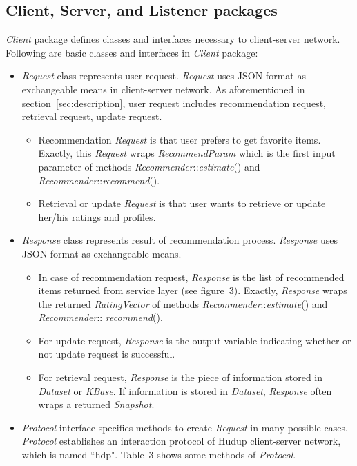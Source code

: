 \documentclass[a4paper]{llncs}
\begin{document}
\subsection{Client, Server, and Listener packages}
\label{subsec:client-server-listener-package}
\textit{Client} package defines classes and interfaces necessary to client-server network. Following are basic classes and interfaces in \textit{Client} package:
\begin{itemize}
\item \textit{Request} class represents user request. \textit{Request} uses JSON format \cite{ecma2013} as exchangeable means in client-server network. As aforementioned in section~\ref{sec:description}, user request includes recommendation request, retrieval request, update request.
  \begin{itemize}
  \item Recommendation \textit{Request} is that user prefers to get favorite items. Exactly, this \textit{Request} wraps \textit{RecommendParam} which is the first input parameter of methods \textit{Recommender}::\textit{estimate}() and \textit{Recommender}::\textit{recommend}().
  \item Retrieval or update \textit{Request} is that user wants to retrieve or update her/his ratings and profiles.
  \end{itemize}
\item \textit{Response} class represents result of recommendation process. \textit{Response} uses JSON format as exchangeable means.
  \begin{itemize}
  \item In case of recommendation request, \textit{Response} is the list of recommended items returned from service layer (see figure~3). Exactly, \textit{Response} wraps the returned \textit{RatingVector} of methods \textit{Recommender}::\textit{estimate}() and \textit{Recommender}:: \textit{recommend}().
  \item For update request, \textit{Response} is the output variable indicating whether or not update request is successful.
  \item For retrieval request, \textit{Response} is the piece of information stored in \textit{Dataset} or \textit{KBase}. If information is stored in \textit{Dataset}, \textit{Response} often wraps a returned \textit{Snapshot}.
  \end{itemize}
\item \textit{Protocol} interface specifies methods to create \textit{Request} in many possible cases. \textit{Protocol} establishes an interaction protocol of Hudup client-server network, which is named ``hdp". Table~3 shows some methods of \textit{Protocol}.

\end{itemize}
\end{document}
